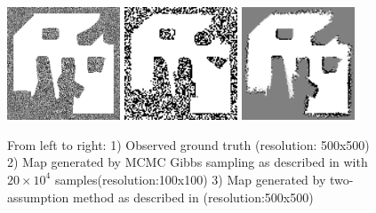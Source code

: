 \documentclass[10pt,oneside,letterpaper]{article}
\begin{document}
\begin{figure}
  \includegraphics[width=0.3\textwidth]{figures/gt-final.png}
  \includegraphics[width=0.3\textwidth]{figures/mcmc_100x100.png}
  \includegraphics[width=0.3\textwidth]{figures/two-assumption_100x100.png}
  \caption{From left to right: 1) Observed ground truth (resolution: 500x500) 2) Map generated by MCMC Gibbs sampling as described in \cite{merali2013icra} with  $20 \times 10^4$ samples(resolution:100x100) 3) Map generated by two-assumption method as described in \cite{merali2013icra} (resolution:500x500) }
  \label{fig:results}
\end{figure}
\end{document}
